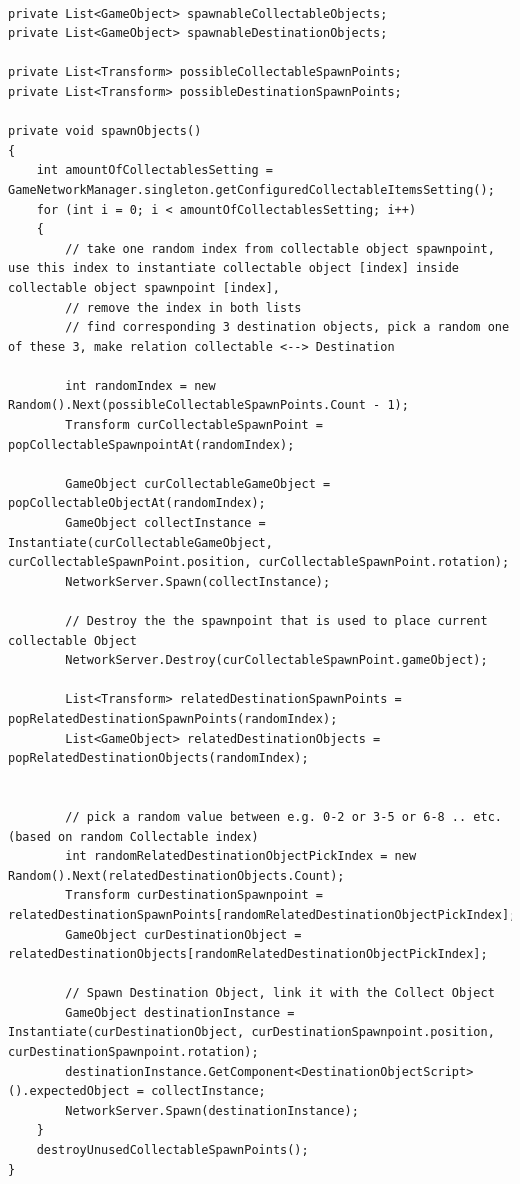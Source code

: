 \begin{lstlisting}[caption= PrepareGameManager.cs Variablen und spawnObjects()]
	
private List<GameObject> spawnableCollectableObjects;
private List<GameObject> spawnableDestinationObjects;

private List<Transform> possibleCollectableSpawnPoints;
private List<Transform> possibleDestinationSpawnPoints;

private void spawnObjects()
{
	int amountOfCollectablesSetting = GameNetworkManager.singleton.getConfiguredCollectableItemsSetting();
	for (int i = 0; i < amountOfCollectablesSetting; i++)
	{
		// take one random index from collectable object spawnpoint, use this index to instantiate collectable object [index] inside collectable object spawnpoint [index],
		// remove the index in both lists
		// find corresponding 3 destination objects, pick a random one of these 3, make relation collectable <--> Destination
		
		int randomIndex = new Random().Next(possibleCollectableSpawnPoints.Count - 1);
		Transform curCollectableSpawnPoint = popCollectableSpawnpointAt(randomIndex);
		
		GameObject curCollectableGameObject = popCollectableObjectAt(randomIndex);
		GameObject collectInstance = Instantiate(curCollectableGameObject, curCollectableSpawnPoint.position, curCollectableSpawnPoint.rotation);
		NetworkServer.Spawn(collectInstance);
		
		// Destroy the the spawnpoint that is used to place current collectable Object
		NetworkServer.Destroy(curCollectableSpawnPoint.gameObject);
		
		List<Transform> relatedDestinationSpawnPoints = popRelatedDestinationSpawnPoints(randomIndex);
		List<GameObject> relatedDestinationObjects = popRelatedDestinationObjects(randomIndex);

		
		// pick a random value between e.g. 0-2 or 3-5 or 6-8 .. etc. (based on random Collectable index)
		int randomRelatedDestinationObjectPickIndex = new Random().Next(relatedDestinationObjects.Count);
		Transform curDestinationSpawnpoint = relatedDestinationSpawnPoints[randomRelatedDestinationObjectPickIndex];
		GameObject curDestinationObject = relatedDestinationObjects[randomRelatedDestinationObjectPickIndex];
		
		// Spawn Destination Object, link it with the Collect Object
		GameObject destinationInstance = Instantiate(curDestinationObject, curDestinationSpawnpoint.position, curDestinationSpawnpoint.rotation);
		destinationInstance.GetComponent<DestinationObjectScript>().expectedObject = collectInstance;
		NetworkServer.Spawn(destinationInstance);
	}
	destroyUnusedCollectableSpawnPoints();
}
\end{lstlisting}

